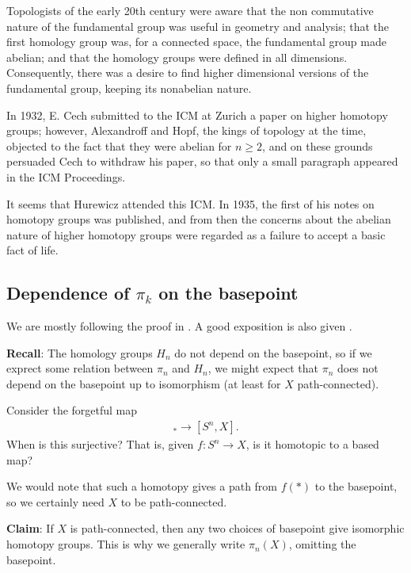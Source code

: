 \documentclass{article}[11pt]
\begin{document}
\epigraph{Topologists of the early 20th century were aware that the non commutative nature of the fundamental group was useful in geometry and analysis; that the first homology group was, for a connected space, the fundamental group made abelian; and that the homology groups were defined in all dimensions. Consequently, there was a desire to find higher dimensional versions of the fundamental group, keeping its nonabelian nature.\vspace{1em}

In 1932, E. Cech submitted to the ICM at Zurich a paper on higher homotopy groups; however, Alexandroff and Hopf, the kings of topology at the time, objected to the fact that they were abelian for $n\geq 2$, and on these grounds persuaded Cech to withdraw his paper, so that only a small paragraph appeared in the ICM Proceedings.\vspace{1em}

It seems that Hurewicz attended this ICM. In 1935, the first of his notes on homotopy groups was published, and from then the concerns about the abelian nature of higher homotopy groups were regarded as a failure to accept a basic fact of life.}{\cite{Ronnie-brown-stack-exchange}}






\subsection{Dependence of \texorpdfstring{$\pi_k$}{pi_k} on the basepoint}

We are mostly following the proof in \cite[Chapter 4]{hatcher}. A good exposition is also given \cite[Section 3]{hutchings}.

\textbf{Recall}: The homology groups $H_n$ do not depend on the basepoint, so if we exprect some relation between $\pi_n$ and $H_n$, we might expect that $\pi_n$ does not depend on the basepoint up to isomorphism (at least for $X$ path-connected).

Consider the forgetful map
\begin{align*}
	[S^n, (X,x_0)]_\ast \to [S^n, X].
\end{align*}
When is this surjective? That is, given $f : S^n \to X$, is it homotopic to a based map?

We would note that such a homotopy gives a path from $f(\ast)$ to the basepoint, so we certainly need $X$ to be path-connected.

\textbf{Claim}: If $X$ is path-connected, then any two choices of basepoint give isomorphic homotopy groups. This is why we generally write $\pi_n(X)$, omitting the basepoint.
\end{document}
